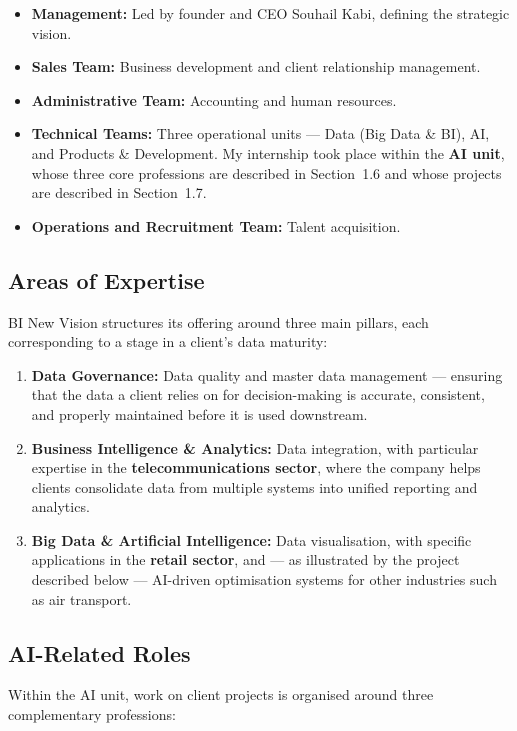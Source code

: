 \documentclass[12pt, a4paper]{article}
\begin{document}
\begin{itemize}
  \item \textbf{Management:} Led by founder and CEO Souhail Kabi, defining the strategic vision.
  \item \textbf{Sales Team:} Business development and client relationship management.
  \item \textbf{Administrative Team:} Accounting and human resources.
  \item \textbf{Technical Teams:} Three operational units --- Data (Big Data \& BI), AI, and Products \& Development. My internship took place within the \textbf{AI unit}, whose three core professions are described in Section~1.6 and whose projects are described in Section~1.7.
  \item \textbf{Operations and Recruitment Team:} Talent acquisition.
\end{itemize}

\subsection{Areas of Expertise}

BI New Vision structures its offering around three main pillars, each corresponding to a stage in a client's data maturity:

\begin{enumerate}
  \item \textbf{Data Governance:} Data quality and master data management --- ensuring that the data a client relies on for decision-making is accurate, consistent, and properly maintained before it is used downstream.
  \item \textbf{Business Intelligence \& Analytics:} Data integration, with particular expertise in the \textbf{telecommunications sector}, where the company helps clients consolidate data from multiple systems into unified reporting and analytics.
  \item \textbf{Big Data \& Artificial Intelligence:} Data visualisation, with specific applications in the \textbf{retail sector}, and --- as illustrated by the project described below --- AI-driven optimisation systems for other industries such as air transport.
\end{enumerate}

\subsection{AI-Related Roles}

Within the AI unit, work on client projects is organised around three complementary professions:
\end{document}
